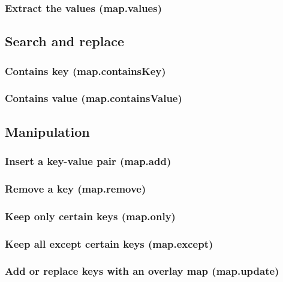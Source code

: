 \documentclass{article}
\theoremstyle{definition}
\begin{document}
\subsubsection{Extract the values (map.values)}

\subsection{Search and replace}

\subsubsection{Contains key (map.containsKey)}

\subsubsection{Contains value (map.containsValue)}

\subsection{Manipulation}

\subsubsection{Insert a key-value pair (map.add)}

\subsubsection{Remove a key (map.remove)}

\subsubsection{Keep only certain keys (map.only)}

\subsubsection{Keep all except certain keys (map.except)}

\subsubsection{Add or replace keys with an overlay map (map.update)}
\end{document}

